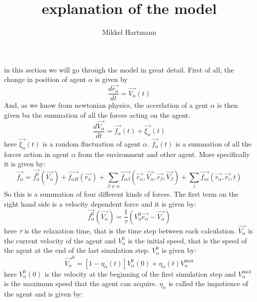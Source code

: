 \documentclass[12pt,a4paper]{report} %
\author{Mikkel Hartmann}
\title{explanation of the model}
\begin{document}
 

in this section we will go through the model in great detail. First of all, the change in position of agent $\alpha$ is given by
	\begin{equation}
		\frac{d \vec{r_{\alpha}}}{dt} = \vec{V_{\alpha}} \left( t \right)
	\end{equation}
And, as we know from newtonian physics, the accerlation of a gent $\alpha$ is then given bu the summation of all the forces acting on the agent.
\begin{equation}
	\frac{d \vec{V_{\alpha}}}{dt} = \vec{f_{\alpha}} \left( t \right) + \vec{\xi_{\alpha}}\left( t \right)
\end{equation}
here $\vec{\xi_{\alpha}} \left( t \right)$ is a random fluctuation of agent $\alpha$. $\vec{f_{\alpha}} \left( t \right)$ is a summation of all the forces action in agent $\alpha$ from the environment and other agent. More specifically it is given by:
\begin{equation}
	\vec{f_{\alpha}} = \vec{f^{0}_{\alpha}}\left( \vec{V_{\alpha}} \right) + \vec{f_{\alpha B}} \left( \vec{r_{\alpha}} \right) + \sum_{\beta \neq \alpha} \vec{f_{\alpha \beta}} \left(\vec{r_{\alpha}}, \vec{V_{\alpha}}, \vec{r_{\beta}}, \vec{V_{\beta}} \right) + \sum_{i} \vec{f_{\alpha i}} \left( \vec{r_{\alpha}}, \vec{r_{i}}, t \right)
\end{equation}
So this is a summation of four different kinds of forces. The first term on the right hand side is a velocity dependent force and it is given by:
\begin{equation}
	\vec{f^{0}_{\alpha}}\left( \vec{V_{\alpha}} \right) = \frac{1}{\tau} \left( V_{\alpha}^{0} \vec{e_{\alpha}} - \vec{V_{\alpha}} \right)
\end{equation}
here $\tau$ is the relaxation time, that is the time step between each calculation. $\vec{V_{\alpha}}$ is the current velocity of the agent and $V_{\alpha}^{0}$ is the initial speed, that is the speed of the agent at the end of the last simulation step. $V_{\alpha}^{0}$ is given by:
\begin{equation}
	\vec{V_{\alpha}}^{0} = \left[ 1 - \eta_{\alpha} \left( t \right) \right] V_{\alpha}^{0} \left( 0 \right) + \eta_{\alpha} \left( t \right)V_{\alpha}^{\text{max}}
\end{equation}
here $V_{\alpha}^{0} \left( 0 \right)$ is the velocity at the beginning of the first simulation step and $V_{\alpha}^{\text{max}}$ is the maximum speed that the agent can acquire. $\eta_{\alpha}$ is called the impatience of the agent and is given by:
\end{document}
